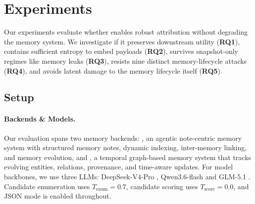 %
%
\section{Experiments}
\label{sec:exp}
Our experiments evaluate whether \memmark{} enables robust attribution without degrading the memory system. We investigate if it preserves downstream utility (\textbf{RQ1}), contains sufficient entropy to embed payloads (\textbf{RQ2}), survives snapshot-only regimes like memory leaks (\textbf{RQ3}), resists nine distinct memory-lifecycle attacks (\textbf{RQ4}), and avoids latent damage to the memory lifecycle itself (\textbf{RQ5}). 

\subsection{Setup}
\label{sec:setup}
\paragraph{Backends \& Models.}
Our evaluation spans two memory backends: \amem{} \cite{amem}, an agentic note-centric memory system with structured memory notes, dynamic indexing, inter-memory linking, and memory evolution, and \graphiti{} \cite{graphiti}, a temporal graph-based memory system that tracks evolving entities, relations, provenance, and time-aware updates. For model backbones, we use three LLMs: DeepSeek-V4-Pro \cite{deepseekai2026deepseekv4}, 
Qwen3.6-flash \cite{qwen36_35b_a3b} and GLM-5.1 \cite{glm5team2026glm5vibecodingagentic}. Candidate enumeration uses
$T_{\text{enum}}{=}0.7$, candidate scoring uses
$T_{\text{score}}{=}0.0$, and JSON mode is enabled throughout.

